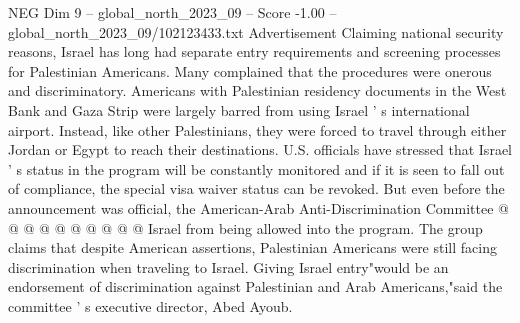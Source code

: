\begin{textsample}{NEG Dim 9 – global\_north\_2023\_09 – Score -1.00 – global\_north\_2023\_09/102123433.txt}
Advertisement Claiming national security reasons, Israel has long had separate entry requirements and screening processes for Palestinian Americans.
Many complained that the procedures were onerous and discriminatory.
Americans with Palestinian residency documents in the West Bank and Gaza Strip were largely barred from using Israel ' s international airport.
Instead, like other Palestinians, they were forced to travel through either Jordan or Egypt to reach their destinations.
U.S. officials have stressed that Israel ' s status in the program will be constantly monitored and if it is seen to fall out of compliance, the special visa waiver status can be revoked.
But even before the announcement was official, the American-Arab Anti-Discrimination Committee @ @ @ @ @ @ @ @ @ @ Israel from being allowed into the program.
The group claims that despite American assertions, Palestinian Americans were still facing discrimination when traveling to Israel.
Giving Israel entry"would be an endorsement of discrimination against Palestinian and Arab Americans,"said the committee ' s executive director, Abed Ayoub.

\end{textsample}
